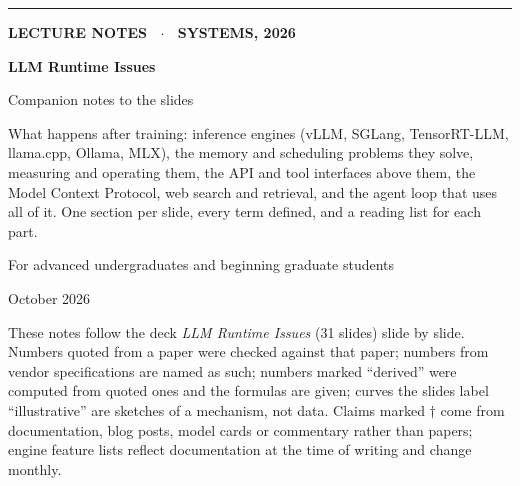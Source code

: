 \documentclass[11pt,letterpaper]{article}
\begin{document}
\begin{titlepage}
\thispagestyle{empty}
\vspace*{2.5cm}
{\color{mlp}\rule{3cm}{3pt}}\par\vspace{0.6cm}
{\sffamily\bfseries\color{muted}\large LECTURE NOTES \ $\cdot$ \ SYSTEMS, 2026\par}
\vspace{0.4cm}
{\sffamily\bfseries\fontsize{34}{38}\selectfont\color{ink} LLM Runtime Issues\par}
\vspace{0.3cm}
{\sffamily\fontsize{18}{22}\selectfont\color{ink} Companion notes to the slides\par}
\vspace{1.2cm}
{\large\color{muted}\parbox{0.82\textwidth}{What happens after training: inference engines (vLLM, SGLang, TensorRT-LLM, llama.cpp, Ollama, MLX), the memory and scheduling problems they solve, measuring and operating them, the API and tool interfaces above them, the Model Context Protocol, web search and retrieval, and the agent loop that uses all of it. One section per slide, every term defined, and a reading list for each part.}\par}
\vspace{1.5cm}
{\color{muted}For advanced undergraduates and beginning graduate students\par}
\vspace{0.3cm}
{\color{muted}October 2026\par}
\vfill
{\small\color{muted}\parbox{0.9\textwidth}{These notes follow the deck \textit{LLM Runtime Issues} (31 slides) slide by slide. Numbers quoted from a paper were checked against that paper; numbers from vendor specifications are named as such; numbers marked ``derived'' were computed from quoted ones and the formulas are given; curves the slides label ``illustrative'' are sketches of a mechanism, not data. Claims marked $\dagger$ come from documentation, blog posts, model cards or commentary rather than papers; engine feature lists reflect documentation at the time of writing and change monthly.}\par}
\end{titlepage}

\tableofcontents
\clearpage
\end{document}
